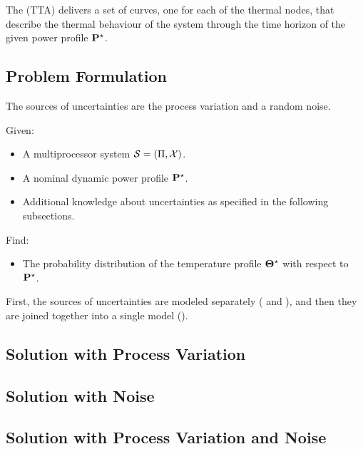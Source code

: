 The  (TTA) delivers a set of curves, one for each of the thermal nodes, that describe the thermal behaviour of the system through the time horizon of the given power profile $\mathbf{P}^\star$.

\subsection{Problem Formulation}
The sources of uncertainties are the process variation and a random noise.

Given:
\begin{itemize}
  \item A multiprocessor system $\mathcal{S} = (\Pi, \mathcal{X})$.
  \item A nominal dynamic power profile $\mathbf{P}^\star$.
  \item Additional knowledge about uncertainties as specified in the following subsections.
\end{itemize}

Find:
\begin{itemize}
  \item The probability distribution of the temperature profile $\mathbf{\Theta}^\star$ with respect to $\mathbf{P}^\star$.
\end{itemize}

First, the sources of uncertainties are modeled separately ( and ), and then they are joined together into a single model ().

\subsection{Solution with Process Variation} 


\subsection{Solution with Noise} 


\subsection{Solution with Process Variation and Noise} 

